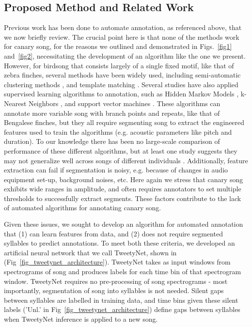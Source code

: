 \documentclass[10pt,letterpaper]{article}
\begin{document}
\subsection*{Proposed Method and Related Work}
\label{Related work}
Previous work has been done to automate annotation, as referenced above, 
that we now briefly review.
The crucial point here is that none of the methods work for canary song, for the 
reasons we outlined and demonstrated in Figs.~\ref{fig1} and~\ref{fig2}, necessitating the 
development of an algorithm like the one we present.
However, for birdsong that consists largely of a single fixed motif, like that of zebra finches,
several methods have been widely used, including semi-automatic clustering methods 
\cite{burkett2015voice,daou2012computational},
and template matching \cite{anderson1996template,yamahachi_undirected_2020,pearre_fast_2017}. 
Several studies have also applied supervised learning algorithms
to annotation, such as Hidden Markov Models \cite{kogan1998automated},
k-Nearest Neighbors \cite{songbrowser}, 
and support vector machines \cite{tachibana2014semi}.
These algorithms can annotate more variable song with branch points and repeats, 
like that of Bengalese finches, 
but they all require segmenting song to extract the engineered features 
used to train the algorithms (e.g. acoustic parameters like pitch and duration).
To our knowledge there has been no large-scale comparison 
of performance of these different algorithms, 
but at least one study suggests they may not generalize well across songs of different 
individuals \cite{nicholson2016comparison}. 
Additionally, feature extraction can fail if segmentation is noisy, 
e.g. because of changes in audio equipment set-up, background noises, etc.
Here again we stress that canary song exhibits wide ranges in amplitude, 
and often requires annotators to set multiple thresholds to successfully extract segments. 
These factors contribute to the lack of automated algorithms for annotating canary song.

Given these issues, we sought to develop an algorithm for automated annotation 
that (1) can learn features from data, and 
(2) does not require segmented syllables to predict annotations.
To meet both these criteria, we developed an artificial neural network 
that we call TweetyNet, shown in (Fig~\ref{fig_tweetynet_architecture}).
TweetyNet takes as input windows from spectrograms of song 
and produces labels for each time bin of that spectrogram window.
TweetyNet requires no pre-processing of song spectrograms - most importantly,  segmentation of song into syllables is not needed. Silent gaps between syllables are labelled in training data, and time bins given these silent labels ('Unl.' in Fig~\ref{fig_tweetynet_architecture}) define gaps between syllables when TweetyNet inference is applied to a new song. 
\end{document}
